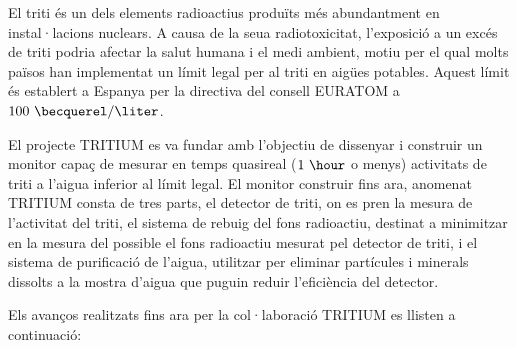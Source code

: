 El triti és un dels elements radioactius produïts més abundantment en instal·lacions nuclears. A causa de la seua radiotoxicitat, l'exposició a un excés de triti podria afectar la salut humana i el medi ambient, motiu per el qual molts països han implementat un límit legal per al triti en aigües potables. Aquest límit és establert a Espanya per la directiva del consell EURATOM \cite{100BqL} a $100~\becquerel/\liter$.

El projecte TRITIUM es va fundar amb l'objectiu de dissenyar i construir un monitor capaç de mesurar en temps quasireal ($1~\hour$ o menys) activitats de triti a l'aigua inferior al límit legal. El monitor construir fins ara, anomenat TRITIUM consta de tres parts, el detector de triti, on es pren la mesura de l'activitat del triti, el sistema de rebuig del fons radioactiu, destinat a minimitzar en la mesura del possible el fons radioactiu mesurat pel detector de triti, i el sistema de purificació de l'aigua, utilitzar per eliminar partícules i minerals dissolts a la mostra d'aigua que puguin reduir l'eficiència del detector.

Els avanços realitzats fins ara per la col·laboració TRITIUM es llisten a continuació:

